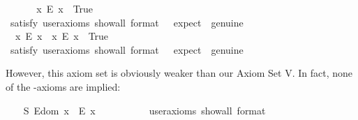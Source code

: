 \begin{isabellebody}
\isadelimproof
\ %
\endisadelimproof
%
\isatagproof
{}\isamarkupfalse%
%
\endisatagproof
{\isafoldproof}%
%
\isadelimproof
%
\endisadelimproof
\isanewline
\ \ \isamarkupfalse%
\ \ {\isachardoublequoteopen}{\isasymexists}x{\isachardot}\ \isactrlbold {\isasymnot}{\isacharparenleft}E\ x{\isacharparenright}{\isachardoublequoteclose}\ \ True\ \ \ %
\ \ \isanewline
\ \ \ \ \isamarkupfalse%
\ {\isacharbrackleft}satisfy{\isacharcomma}\ user{\isacharunderscore}axioms{\isacharcomma}\ show{\isacharunderscore}all{\isacharcomma}\ format\ {\isacharequal}\ {}{\isacharcomma}\ expect\ {\isacharequal}\ genuine{\isacharbrackright}%
\isadelimproof
\ %
\endisadelimproof
%
\isatagproof
{}\isamarkupfalse%
%
\endisatagproof
{\isafoldproof}%
%
\isadelimproof
%
\endisadelimproof
\isanewline
\ \ \isamarkupfalse%
\ \ {\isachardoublequoteopen}{\isacharparenleft}{\isasymexists}x{\isachardot}\ \isactrlbold {\isasymnot}{\isacharparenleft}E\ x{\isacharparenright}{\isacharparenright}\ {\isasymand}\ {\isacharparenleft}{\isasymexists}x{\isachardot}\ {\isacharparenleft}E\ x{\isacharparenright}{\isacharparenright}{\isachardoublequoteclose}\ \ True\ \ %
\ \isanewline
\ \ \ \ \isamarkupfalse%
\ {\isacharbrackleft}satisfy{\isacharcomma}\ user{\isacharunderscore}axioms{\isacharcomma}\ show{\isacharunderscore}all{\isacharcomma}\ format\ {\isacharequal}\ {}{\isacharcomma}\ expect\ {\isacharequal}\ genuine{\isacharbrackright}%
\isadelimproof
\ %
\endisadelimproof
%
\isatagproof
{}\isamarkupfalse%
%
\endisatagproof
{\isafoldproof}%
%
\isadelimproof
%
\endisadelimproof
%
\begin{isamarkuptext}%
However, this axiom set is obviously weaker than our Axiom Set V. In fact, none of 
the -axioms are implied:%
\end{isamarkuptext}\isamarkuptrue%
\ \ \isamarkupfalse%
\ S{}{\isacharcolon}\ {\isachardoublequoteopen}E{\isacharparenleft}dom\ x{\isacharparenright}\ \isactrlbold {\isasymrightarrow}\ E\ x{\isachardoublequoteclose}\ \ %
\ \ \isanewline
\ \ \ \ \isamarkupfalse%
\ {\isacharbrackleft}user{\isacharunderscore}axioms{\isacharcomma}\ show{\isacharunderscore}all{\isacharcomma}\ format\ {\isacharequal}\ {}{\isacharbrackright}%

\end{isabellebody}
